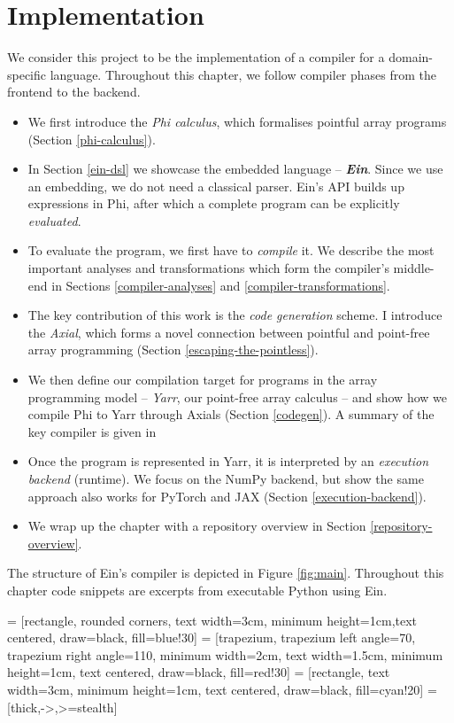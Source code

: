\chapter{Implementation}

We consider this project to be the implementation of a compiler for a domain-specific language. Throughout this chapter, we follow compiler phases from the frontend to the backend. 
\begin{itemize}
    \item We first introduce the \textit{Phi calculus}, which formalises pointful array programs (Section \ref{phi-calculus}). 
    \item In Section \ref{ein-dsl} we showcase the embedded language -- \textit{\textbf{Ein}}. Since we use an embedding, we do not need a classical parser. Ein's API builds up expressions in Phi, after which a complete program can be explicitly \textit{evaluated}.
    \item To evaluate the program, we first have to \textit{compile} it. We describe the most important analyses and transformations which form the compiler's middle-end in Sections \ref{compiler-analyses} and \ref{compiler-transformations}.
    \item The key contribution of this work is the \textit{code generation} scheme. I introduce the \textit{Axial}, which forms a novel connection between pointful and point-free array programming (Section \ref{escaping-the-pointless}). 
    \item We then define our compilation target for programs in the array programming model -- \textit{Yarr}, our point-free array calculus -- and show how we compile Phi to Yarr through Axials (Section \ref{codegen}). A summary of the key compiler is given in  
    \item Once the program is represented in Yarr, it is interpreted by an \textit{execution backend} (runtime). We focus on the NumPy backend, but show the same approach also works for PyTorch and JAX (Section \ref{execution-backend}).
    \item We wrap up the chapter with a repository overview in Section \ref{repository-overview}.
\end{itemize}
The structure of Ein's compiler is depicted in Figure \ref{fig:main}.
Throughout this chapter code snippets are excerpts from executable Python using Ein. 

 = [rectangle, rounded corners, text width=3cm, minimum height=1cm,text centered, draw=black, fill=blue!30]
 = [trapezium, trapezium left angle=70, trapezium right angle=110, minimum width=2cm, text width=1.5cm, minimum height=1cm, text centered, draw=black, fill=red!30]
 = [rectangle, text width=3cm, minimum height=1cm, text centered, draw=black, fill=cyan!20]
 = [thick,->,>=stealth]


